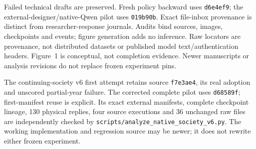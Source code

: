 \documentclass{article}
\newcommand{\code}[1]{\texttt{#1}}
\begin{document}
Failed technical drafts are preserved. Fresh policy backward uses
\code{d6e4ef9}; the external-designer/native-Qwen pilot uses \code{019b90b}.
Exact file-inbox provenance is distinct from researcher-response journals.
Audits bind sources, images, checkpoints and events; figure generation adds no
inference. Raw locators are provenance, not distributed datasets or published
model text/authentication headers. Figure~1 is conceptual, not completion evidence.
Newer manuscripts or analysis revisions do not replace frozen experiment pins.

The continuing-society v6 first attempt retains source \code{f7e3ae4}, its real
adoption and unscored partial-year failure. The corrected complete pilot uses
\code{d68589f}; first-manifest reuse is explicit. Its exact external manifests,
complete checkpoint lineage, 130 physical replies, four source executions and
36 unchanged raw files are independently checked by
\code{scripts/analyze\_native\_society\_v6.py}. The working implementation and
regression source may be newer; it does not rewrite either frozen experiment.



\end{document}
